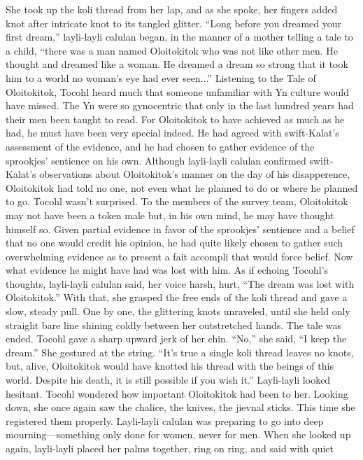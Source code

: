 \documentclass[9pt]{article}
\begin{document}
She took up the koli thread from her lap, and as she spoke, her fingers added knot after intricate knot to
its tangled glitter.
“Long before you dreamed your first dream,” layli-layli calulan began, in the manner of a mother
telling a tale to a child, “there was a man named Oloitokitok who was not like other men. He thought and
dreamed like a woman. He dreamed a dream so strong that it took him to a world no woman’s eye had
ever seen...”
Listening to the Tale of Oloitokitok, Tocohl heard much that someone unfamiliar with Yn culture
would have missed. The Yn were so gynocentric that only in the last hundred years had their men been
taught to read. For Oloitokitok to have achieved as much as he had, he must have been very special
indeed.
He had agreed with swift-Kalat’s assessment of the evidence, and he had chosen to gather evidence
of the sprookjes’ sentience on his own. Although layli-layli calulan confirmed swift-Kalat’s
observations about Oloitokitok’s manner on the day of his disapperence, Oloitokitok had told no one,
not even what he planned to do or where he planned to go.
Tocohl wasn’t surprised. To the members of the survey team, Oloitokitok may not have been a
token male but, in his own mind, he may have thought himself so. Given partial evidence in favor of the
sprookjes’ sentience and a belief that no one would credit his opinion, he had quite likely chosen to
gather such overwhelming evidence as to present a fait accompli that would force belief.
Now what evidence he might have had was lost with him.
As if echoing Tocohl’s thoughts, layli-layli calulan said, her voice harsh, hurt, “The dream was lost
with Oloitokitok.” With that, she grasped the free ends of the koli thread and gave a slow, steady pull.
One by one, the glittering knots unraveled, until she held only straight bare line shining coldly between her
outstretched hands. The tale was ended.
Tocohl gave a sharp upward jerk of her chin. “No,” she said, “I keep the dream.” She gestured at
the string. “It’s true a single koli thread leaves no knots, but, alive, Oloitokitok would have knotted his
thread with the beings of this world. Despite his death, it is still possible if you wish it.”
Layli-layli looked hesitant. Tocohl wondered how important Oloitokitok had been to her. Looking
down, she once again saw the chalice, the knives, the jievnal sticks. This time she registered them
properly. Layli-layli calulan was preparing to go into deep mourning—something only done for women,
never for men.
When she looked up again, layli-layli placed her palms together, ring on ring, and said with quiet
\end{document}
